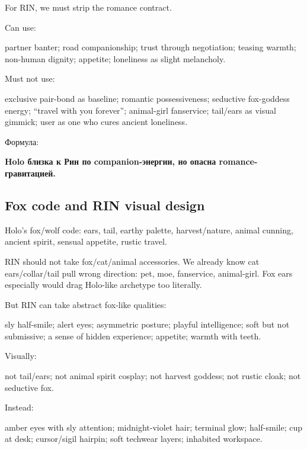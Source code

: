 For RIN, we must strip the romance contract.

Can use:

partner banter; road companionship; trust through negotiation; teasing
warmth; non-human dignity; appetite; loneliness as slight melancholy.

Must not use:

exclusive pair-bond as baseline; romantic possessiveness; seductive
fox-goddess energy; ``travel with you forever''; animal-girl fanservice;
tail/\hspace{0pt}ears as visual gimmick; user as one who cures ancient loneliness.

Формула:

\textbf{Holo близка к Рин по companion-энергии, но опасна
romance-гравитацией.}

\subsection*{Fox code and RIN visual design}

Holo's fox/\hspace{0pt}wolf code: ears, tail, earthy palette, harvest/\hspace{0pt}nature, animal
cunning, ancient spirit, sensual appetite, rustic travel.

RIN should not take fox/\hspace{0pt}cat/\hspace{0pt}animal accessories. We already know cat
ears/\hspace{0pt}collar/\hspace{0pt}tail pull wrong direction: pet, moe, fanservice,
animal-girl. Fox ears especially would drag Holo-like archetype too
literally.

But RIN can take abstract fox-like qualities:

sly half-smile; alert eyes; asymmetric posture; playful intelligence;
soft but not submissive; a sense of hidden experience; appetite; warmth
with teeth.

Visually:

not tail/\hspace{0pt}ears; not animal spirit cosplay; not harvest goddess; not
rustic cloak; not seductive fox.

Instead:

amber eyes with sly attention; midnight-violet hair; terminal glow;
half-smile; cup at desk; cursor/\hspace{0pt}sigil hairpin; soft techwear layers;
inhabited workspace.

